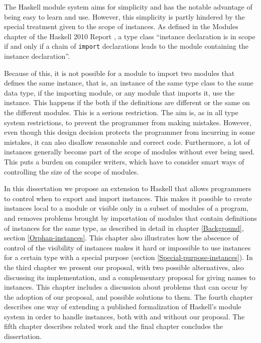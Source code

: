 \documentclass[msc]{ppgccufmg}
\begin{document}
The Haskell module system aims for simplicity \citep[section~8.2]{history}
and has the notable advantage of being easy to learn and use. However,
this simplicity is partly hindered by the special treatment given to
the scope of instances. As defined in the Modules chapter of the
Haskell 2010 Report \citep[section~5.4]{report}, a type class
``instance declaration is in scope if and only if a chain of
\texttt{import} declarations leads to the module containing the
instance declaration''.

Because of this, it is not possible for a module to import two modules that defines the same instance, that is, an instance of the same type class to the same data type, if the importing module, or any module that imports it, use the instance.  This happens if the both if the definitions are different or the same on the different modules.  This is a
serious
restriction. The aim is, as in all type system restrictions, to
prevent the programmer from making mistakes.  However, even though
this design decision protects the programmer from incurring in some
mistakes, it can also disallow reasonable and correct code.
Furthermore, a lot of instances generally become part of the scope of
modules without ever being used.  This puts a burden on compiler
writers, which have to consider smart ways of controlling the size of
the scope of modules.

In this dissertation we propose an extension to Haskell that
allows programmers to control when to export and import instances.
This makes it possible to create instances local to a module or
visible only in a subset of modules of a program, and removes problems
brought by importation of modules that contain definitions of
instances for the same type, as described in detail in chapter
\ref{Background}, section \ref{Orphan-instances}.  This chapter
also illustrates how the abscence of control of the visibility of
instances makes it hard or impossible to use instances for a certain
type with a special purpose (section
\ref{Special-purpose-instances}). In the third chapter we present our
proposal, with two possible alternatives, also discussing its
implementation, and a complementary proposal for giving names to
instances.  This chapter includes a discussion about problems that can
occur by the adoption of our proposal, and possible solutions to them.
The fourth chapter describes one way of extending a published
formalization of Haskell's module system \citep{formal} in order to
handle instances, both with and without our proposal. The fifth
chapter describes related work and the final chapter concludes the
dissertation.
\end{document}

